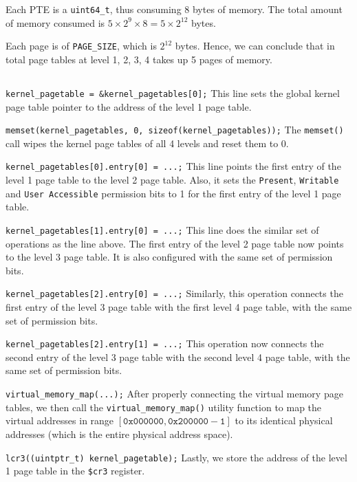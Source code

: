 \documentclass[12pt]{article}
\begin{document}
Each PTE is a \texttt{uint64\_t}, thus consuming $8$ bytes of memory. The total amount of memory consumed is $5\times 2^9 \times 8 = 5 \times 2^{12}$ bytes.

Each page is of \texttt{PAGE\_SIZE}, which is $2^{12}$ bytes. Hence, we can conclude that in total page tables at level 1, 2, 3, 4 takes up 5 pages of memory.


\subsection{}

\texttt{kernel\_pagetable = \&kernel\_pagetables[0];} This line sets the global kernel page table pointer to the address of the level 1 page table.

\texttt{memset(kernel\_pagetables, 0, sizeof(kernel\_pagetables));} The \texttt{memset()} call wipes the kernel page tables of all 4 levels and reset them to 0.

\texttt{kernel\_pagetables[0].entry[0] = ...;} This line points the first entry of the level 1 page table to the level 2 page table. Also, it sets the \texttt{Present}, \texttt{Writable} and \texttt{User Accessible} permission bits to 1 for the first entry of the level 1 page table.

\texttt{kernel\_pagetables[1].entry[0] = ...;} This line does the similar set of operations as the line above. The first entry of the level 2 page table now points to the level 3 page table. It is also configured with the same set of permission bits.

\texttt{kernel\_pagetables[2].entry[0] = ...;} Similarly, this operation connects the first entry of the level 3 page table with the first level 4 page table, with the same set of permission bits.

\texttt{kernel\_pagetables[2].entry[1] = ...;} This operation now connects the second entry of the level 3 page table with the second level 4 page table, with the same set of permission bits.

\texttt{virtual\_memory\_map(...);} After properly connecting the virtual memory page tables, we then call the \texttt{virtual\_memory\_map()} utility function to map the virtual addresses in range $[\mathtt{0x000000},\mathtt{0x200000 - 1}]$ to its identical physical addresses (which is the entire physical address space).

\texttt{lcr3((uintptr\_t) kernel\_pagetable);} Lastly, we store the address of the level 1 page table in the \texttt{\$cr3} register. 
\end{document}
